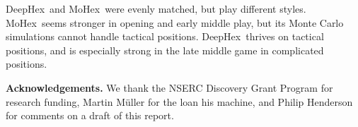\documentclass{icga}
\def\Dx{\mbox{\sc DeepHex}}
\def\Eo{\mbox{\sc Ezo}}
\def\Mx{\mbox{\sc MoHex}}
\begin{document}
\Dx\ and \Mx\ were evenly matched, but play different styles.
\Mx\ seems stronger in opening and early middle play,
but its Monte Carlo simulations cannot handle tactical positions.
\Dx\ thrives on tactical positions, and is especially
strong in the late middle game in complicated positions.

{\bf Acknowledgements.}
We thank the NSERC Discovery Grant Program for research funding,
Martin M\"{u}ller for the loan his machine,
and Philip Henderson for comments on a draft of this report.














\end{document}
